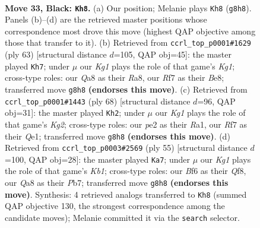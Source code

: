 \documentclass[11pt]{article}
\begin{document}
\clearpage

\begin{figure}[p]\centering
\begin{subfigure}{0.46\textwidth}\centering
\resizebox{\linewidth}{!}{%
\newchessgame
\chessboard[
  setfen={q1b3k1/p2n1r1p/1r3b2/2p5/Pp1p1P2/1P1Q2N1/R3P3/1NBK1R2 b - - 13 33},
  showmover=false,
  pgfstyle=straightmove, color=movearrow, markmove={g8-h8}
]}
\caption{}
\end{subfigure}\hfill
\begin{subfigure}{0.46\textwidth}\centering
\resizebox{\linewidth}{!}{%
\newchessgame
\chessboard[
  setfen={r3b1k1/6p1/1qnp1p2/r3p3/1p2P2P/1P5P/PR1Q1PBK/2R1N3 b - - 0 32},
  showmover=false,
  pgfstyle=straightmove, color=movearrow, markmove={g8-h7}
]}
\caption{}
\end{subfigure}
\\[4pt]
\begin{subfigure}{0.46\textwidth}\centering
\resizebox{\linewidth}{!}{%
\newchessgame
\chessboard[
  setfen={r5k1/2rb1p2/1n1q2p1/1P1p3p/p2N3P/4P1P1/R3BPK1/R3Q3 w - - 18 35},
  showmover=false,
  pgfstyle=straightmove, color=movearrow, markmove={g2-h2}
]}
\caption{}
\end{subfigure}\hfill
\begin{subfigure}{0.46\textwidth}\centering
\resizebox{\linewidth}{!}{%
\newchessgame
\chessboard[
  setfen={1k1r1q1r/1p1bnp2/p3p3/3pP1R1/3P1Q2/2N5/PP2BP2/1K4R1 b - - 3 28},
  showmover=false,
  pgfstyle=straightmove, color=movearrow, markmove={b8-a7}
]}
\caption{}
\end{subfigure}
\caption{\textbf{Move 33, Black: \texttt{Kh8}.} (a) Our position; Melanie plays \texttt{Kh8} (\texttt{g8h8}). Panels (b)--(d) are the retrieved master positions whose correspondence most drove this move (highest QAP objective among those that transfer to it). (b) Retrieved from \texttt{ccrl\_top\_p0001\#1629} (ply 63) [structural distance $d$=105, QAP obj=45]: the master played \texttt{Kh7}; under $\mu$ our \emph{Kg1} plays the role of that game's \emph{Kg1}; cross-type roles: our \emph{Q}a8 as their \emph{R}a8, our \emph{R}f7 as their \emph{B}e8; transferred move \texttt{g8h8} \textbf{(endorses this move)}. (c) Retrieved from \texttt{ccrl\_top\_p0001\#1443} (ply 68) [structural distance $d$=96, QAP obj=31]: the master played \texttt{Kh2}; under $\mu$ our \emph{Kg1} plays the role of that game's \emph{Kg2}; cross-type roles: our \emph{p}e2 as their \emph{R}a1, our \emph{R}f7 as their \emph{Q}e1; transferred move \texttt{g8h8} \textbf{(endorses this move)}. (d) Retrieved from \texttt{ccrl\_top\_p0003\#2569} (ply 55) [structural distance $d$=100, QAP obj=28]: the master played \texttt{Ka7}; under $\mu$ our \emph{Kg1} plays the role of that game's \emph{Kb1}; cross-type roles: our \emph{B}f6 as their \emph{Q}f8, our \emph{Q}a8 as their \emph{P}b7; transferred move \texttt{g8h8} \textbf{(endorses this move)}. Synthesis: 4 retrieved analogs transferred to \texttt{Kh8} (summed QAP objective 130, the strongest correspondence among the candidate moves); Melanie committed it via the \texttt{search} selector.}
\label{fig:thought-m65}
\end{figure}
\end{document}
